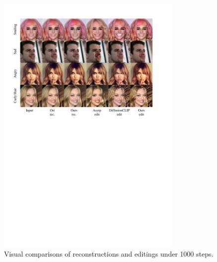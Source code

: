 \documentclass[letterpaper]{article} %
\begin{document}
\begin{figure}[t]
    \centering
    \includegraphics[width=0.8\textwidth]{Figs/fig13.pdf}
    \caption{Visual comparisons of reconstructions and editings under 1000 steps.}
    \label{fig14}
\end{figure}
\end{document}
